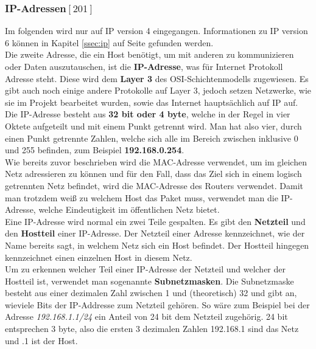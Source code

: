 \documentclass[12pt,a4paper]{report}
\begin{document}
\begin{onehalfspace}
\subsubsection{IP-Adressen${[201]}$}\label{sssec:ipaddr}
Im folgenden wird nur auf IP version 4 eingegangen. Informationen zu IP version 6 können in Kapitel \ref{ssec:ip} auf Seite \pageref{ssec:ip} gefunden werden.\\

Die zweite Adresse, die ein Host benötigt, um mit anderen zu kommunizieren oder Daten auszutauschen, ist die \textbf{IP-Adresse}, was für Internet Protokoll Adresse steht. Diese wird dem \textbf{Layer 3} des OSI-Schichtenmodells zugewiesen. Es gibt auch noch einige andere Protokolle auf Layer 3, jedoch setzen Netzwerke, wie sie im Projekt bearbeitet wurden, sowie das Internet hauptsächlich auf IP auf.\\

Die IP-Adresse besteht aus \textbf{32 bit oder 4 byte}, welche in der Regel in vier Oktete aufgeteilt und mit einem Punkt getrennt wird. Man hat also vier, durch einen Punkt getrennte Zahlen, welche sich alle im Bereich zwischen inklusive 0 und 255 befinden, zum Beispiel \textbf{192.168.0.254}.\\

Wie bereits zuvor beschrieben wird die MAC-Adresse verwendet, um im gleichen Netz adressieren zu können und für den Fall, dass das Ziel sich in einem logisch getrennten Netz befindet, wird die MAC-Adresse des Routers verwendet. Damit man trotzdem weiß zu welchem Host das Paket muss, verwendet man die IP-Adresse, welche Eindeutigkeit im öffentlichen Netz bietet.\\

Eine IP-Adresse wird normal ein zwei Teile gespalten. Es gibt den \textbf{Netzteil} und den \textbf{Hostteil} einer IP-Adresse. Der Netzteil einer Adresse kennzeichnet, wie der Name bereits sagt, in welchem Netz sich ein Host befindet. Der Hostteil hingegen kennzeichnet einen einzelnen Host in diesem Netz.\\
Um zu erkennen welcher Teil einer IP-Adresse der Netzteil und welcher der Hostteil ist, verwendet man sogenannte \textbf{Subnetzmasken}. Die Subnetzmaske besteht aus einer dezimalen Zahl zwischen 1 und (theoretisch) 32 und gibt an, wieviele Bits der IP-Addresse zum Netzteil gehören. So wäre zum Beispiel bei der Adresse \textit{192.168.1.1/24} ein Anteil von 24 bit dem Netzteil zugehörig. 24 bit entsprechen 3 byte, also die ersten 3 dezimalen Zahlen 192.168.1 sind das Netz und .1 ist der Host.

\end{onehalfspace}
\end{document}

